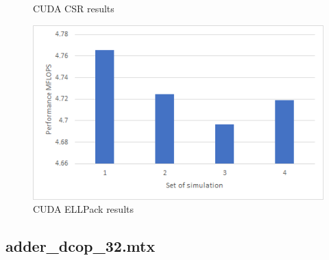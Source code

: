 \documentclass{scrreprt}
\begin{document}
\begin{figure}[ht]
\begin{minipage}[b]{0.5\linewidth}
    \caption{CUDA CSR results} 
    \vspace{4ex}
  \end{minipage}%
  \begin{minipage}[b]{0.5\linewidth}
    \centering
    \includegraphics[width=.9\linewidth]{cage4ELLCUDA.png} 
    \caption{CUDA ELLPack  results} 
    \vspace{4ex}
  \end{minipage} 
\end{figure}
\FloatBarrier

\subsection{adder_dcop_32.mtx}
\end{document}
